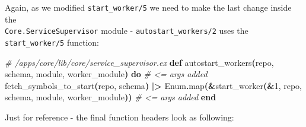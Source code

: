 \documentclass[
  oneside]{book}
\newenvironment{Shaded}{\begin{snugshade}}{\end{snugshade}}
\newcommand{\CommentTok}[1]{\textcolor[rgb]{0.56,0.35,0.01}{\textit{#1}}}
\newcommand{\ConstantTok}[1]{\textcolor[rgb]{0.56,0.35,0.01}{#1}}
\newcommand{\DecValTok}[1]{\textcolor[rgb]{0.00,0.00,0.81}{#1}}
\newcommand{\FunctionTok}[1]{\textcolor[rgb]{0.13,0.29,0.53}{\textbf{#1}}}
\newcommand{\KeywordTok}[1]{\textcolor[rgb]{0.13,0.29,0.53}{\textbf{#1}}}
\newcommand{\NormalTok}[1]{#1}
\newcommand{\OperatorTok}[1]{\textcolor[rgb]{0.81,0.36,0.00}{\textbf{#1}}}
\begin{document}
Again, as we modified \texttt{start\_worker/5} we need to make the last change inside the\\
\texttt{Core.ServiceSupervisor} module - \texttt{autostart\_workers/2} uses the \texttt{start\_worker/5} function:

\begin{Shaded}
\begin{Highlighting}[]
  \CommentTok{\# /apps/core/lib/core/service\_supervisor.ex}
  \KeywordTok{def}\NormalTok{ autostart\_workers}\FunctionTok{(}\NormalTok{repo, schema, module, worker\_module}\FunctionTok{)} \KeywordTok{do} \CommentTok{\# \textless{}= args added}
\NormalTok{    fetch\_symbols\_to\_start}\FunctionTok{(}\NormalTok{repo, schema}\FunctionTok{)}
    \OperatorTok{|\textgreater{}} \ConstantTok{Enum}\OperatorTok{.}\NormalTok{map}\FunctionTok{(}\OperatorTok{\&}\NormalTok{start\_worker}\FunctionTok{(}\OperatorTok{\&}\DecValTok{1}\NormalTok{, repo, schema, module, worker\_module}\FunctionTok{))} \CommentTok{\# \textless{}= args added}
  \KeywordTok{end}
\end{Highlighting}
\end{Shaded}

Just for reference - the final function headers look as following:
\end{document}
